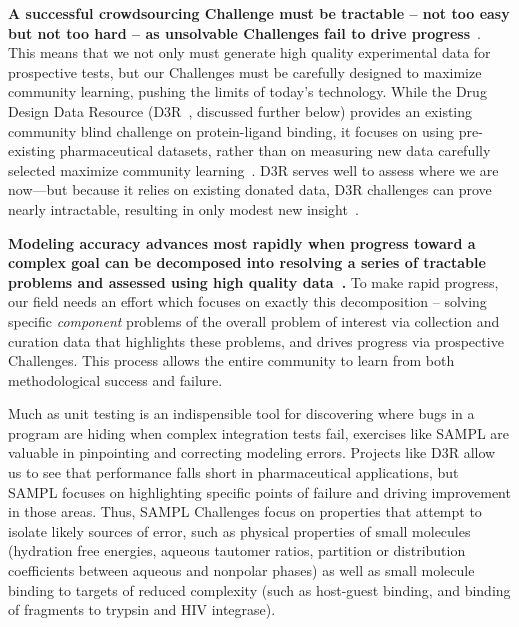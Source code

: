 \documentclass[11pt]{article}
\begin{document}
{\bf A successful crowdsourcing Challenge must be tractable -- not too easy but not too hard -- as unsolvable Challenges fail to drive progress}~\cite{Saez-Rodriguez:2016:NatRevGenet}. 
This means that we not only must generate high quality experimental data for prospective tests, but our Challenges must be carefully designed to maximize community learning, pushing the limits of today's technology.
While the Drug Design Data Resource (D3R~\cite{Gathiaka:2016:JComputAidedMolDes}, discussed further below) provides an existing community blind challenge on protein-ligand binding, it focuses on using pre-existing pharmaceutical datasets, rather than on measuring new data carefully selected maximize community learning~\cite{Gathiaka:2016:JComputAidedMolDes}. 
D3R serves well to assess where we are now---but because it relies on existing donated data, D3R challenges can prove nearly intractable, resulting in only modest new insight~\cite{D3R_lessons_learned}.

\textbf{Modeling accuracy advances most rapidly when progress toward a complex goal can be decomposed into resolving a series of tractable problems and assessed using high quality data~\cite{Saez-Rodriguez:2016:NatRevGenet}.}
To make rapid progress, our field needs an effort which focuses on exactly this decomposition -- solving specific \emph{component} problems of the overall problem of interest via collection and curation data that highlights these problems, and drives progress via prospective Challenges.
This process allows the entire community to learn from both methodological success and failure. 

Much as unit testing is an indispensible tool for discovering where bugs in a program are hiding when complex integration tests fail, exercises like SAMPL are valuable in pinpointing and correcting modeling errors.
Projects like D3R allow us to see that performance falls short in pharmaceutical applications, but SAMPL focuses on highlighting specific points of failure and driving improvement in those areas. 
Thus, SAMPL Challenges focus on properties that attempt to isolate likely sources of error, such as physical properties of small molecules (hydration free energies, aqueous tautomer ratios, partition or distribution coefficients between aqueous and nonpolar phases) as well as small molecule binding to targets of reduced complexity (such as host-guest binding, and binding of fragments to trypsin and HIV integrase).
\end{document}
